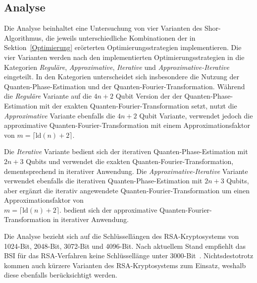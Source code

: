 \subsection*{Analyse}
Die Analyse beinhaltet eine Untersuchung von vier Varianten des Shor-Algorithmus, 
die jeweils unterschiedliche Kombinationen der in Sektion~\ref{Optimierung} erörterten Optimierungsstrategien implementieren.
Die vier Varianten werden nach den implementierten Optimierungsstrategien in die Kategorien \textit{Reguläre}, 
\textit{Approximative}, \textit{Iterative} und \textit{Approximative-Iterative} eingeteilt.
In den Kategorien unterscheidet sich insbesondere die Nutzung der Quanten-Phase-Estimation und der Quanten-Fourier-Transformation. 
Während die \textit{Reguläre} Variante auf die \(4n+2\) Qubit Version der der Quanten-Phase-Estimation mit der exakten Quanten-Fourier-Transformation setzt, 
nutzt die \textit{Approximative} Variante ebenfalls die \(4n+2\) Qubit Variante, 
verwendet jedoch die approximative Quanten-Fourier-Transformation mit einem Approximationsfaktor von \(m = \lceil\text{ld}(n)+2\rceil\).

Die \textit{Iterative} Variante bedient sich der iterativen Quanten-Phase-Estimation mit \(2n+3\) Qubits und 
verwendet die exakten Quanten-Fourier-Transformation, dementsprechend in iterativer Anwendung.
Die \textit{Approximative-Iterative} Variante verwendet ebenfalls die iterativen Quanten-Phase-Estimation mit \(2n+3\) Qubits, 
aber ergänzt die iterativ angewendete Quanten-Fourier-Transformation um einen Approximationsfaktor von \\\(m = \lceil\text{ld}(n)+2\rceil\).
bedient sich der approximative Quanten-Fourier-Transformation in iterativer Anwendung.

Die Analyse bezieht sich auf die Schlüssellängen des RSA-Kryptosystems von 1024-Bit, 2048-Bit, 3072-Bit und 4096-Bit. 
Nach aktuellem Stand empfiehlt das BSI für das RSA-Verfahren keine Schlüssellänge unter 3000-Bit~\cite{BSI2023}. 
Nichtsdestotrotz kommen auch kürzere Varianten des RSA-Kryptosystems zum Einsatz, weshalb diese ebenfalls berücksichtigt werden.

\vspace{1em}

